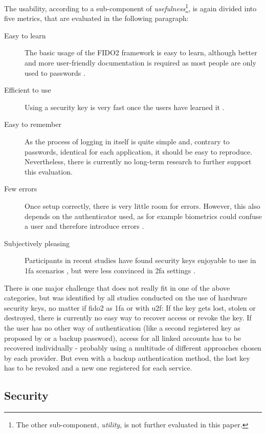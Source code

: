 The usability, according to \cite[25 \psq]{nielsen1993} a sub-component of \emph{usefulness}\footnote{The other sub-component, \emph{utility}, is not further evaluated in this paper.}, is again divided into five metrics, that are evaluated in the following paragraph:

\begin{description}
    \item[Easy to learn] The basic usage of the FIDO2 framework is easy to learn, although better and more user-friendly documentation is required as most people are only used to passwords \cite{lyastani2020,hunt2018b,das2018}.
    \item[Efficient to use] Using a security key is very fast once the users have learned it \cite{lang2017}.
    \item[Easy to remember] As the process of logging in itself is quite simple and, contrary to passwords, identical for each application, it should be easy to reproduce. Nevertheless, there is currently no long-term research to further support this evaluation.
    \item[Few errors] Once setup correctly, there is very little room for errors. However, this also depends on the authenticator used, as for example biometrics could confuse a user and therefore introduce errors \cite{lyastani2020}.
    \item[Subjectively pleasing] Participants in recent studies have found security keys enjoyable to use in \ac{1fa} scenarios \citep{lyastani2020}, but were less convinced in \ac{2fa} settings \cite{das2018}.
\end{description}

There is one major challenge that does not really fit in one of the above categories, but was identified by all studies conducted on the use of hardware security keys, no matter if \ac{fido2} as \ac{1fa} or with \ac{u2f}: If the key gets lost, stolen or destroyed, there is currently no easy way to recover access or revoke the key. If the user has no other way of authentication (like a second registered key as proposed by \cite{gomi2019} or a backup password), access for all linked accounts has to be recovered individually - probably using a multitude of different approaches chosen by each provider. But even with a backup authentication method, the lost key has to be revoked and a new one registered for each service.\\


\subsection{Security}
\label{subsec:security}

